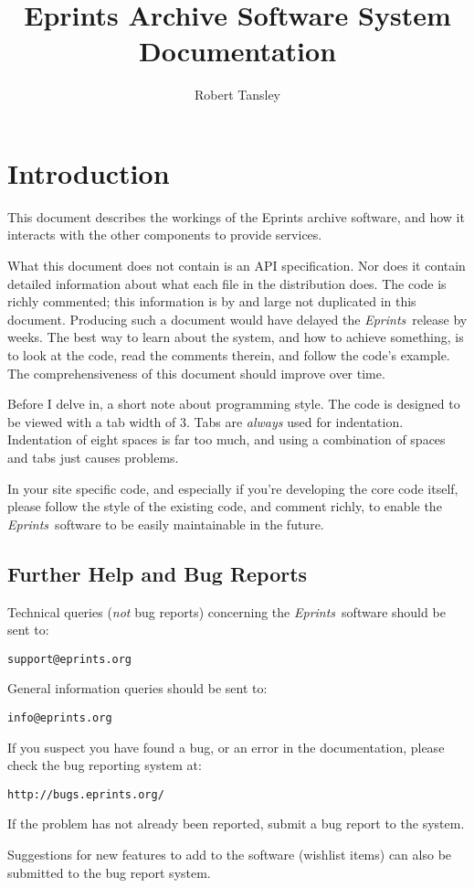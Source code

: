 \documentclass[a4paper]{article}
\title{Eprints Archive Software System Documentation}
\author{Robert Tansley}
\newcommand{\eprints}{\emph{Eprints}}
\begin{document}
\maketitle

\section{Introduction}

This document describes the workings of the Eprints archive software, and how it interacts with the other components to provide services.

What this document does not contain is an API specification. Nor does it contain detailed information about what each file in the distribution does. The code is richly commented; this information is by and large not duplicated in this document. Producing such a document would have delayed the \eprints\ release by weeks. The best way to learn about the system, and how to achieve something, is to look at the code, read the comments therein, and follow the code's example. The comprehensiveness of this document should improve over time.

Before I delve in, a short note about programming style. The code is designed to be viewed with a tab width of 3. Tabs are \emph{always} used for indentation. Indentation of eight spaces is far too much, and using a combination of spaces and tabs just causes problems.

In your site specific code, and especially if you're developing the core code itself, please follow the style of the existing code, and comment richly, to enable the \eprints\ software to be easily maintainable in the future.

\subsection{Further Help and Bug Reports}

Technical queries (\emph{not} bug reports) concerning the \eprints\ software should be sent to:

\begin{verbatim}
support@eprints.org
\end{verbatim}

General information queries should be sent to:

\begin{verbatim}
info@eprints.org
\end{verbatim}

If you suspect you have found a bug, or an error in the documentation, please check the bug reporting system at:

\begin{verbatim}
http://bugs.eprints.org/
\end{verbatim}

If the problem has not already been reported, submit a bug report to the system.

Suggestions for new features to add to the software (wishlist items) can also be submitted to the bug report system.



\end{document}
